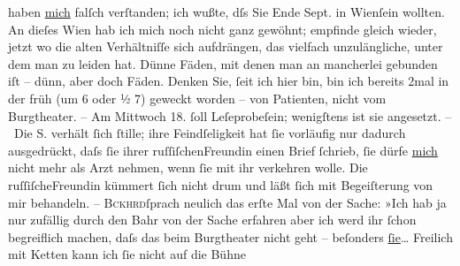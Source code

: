 \begin{ledgroupsized}[t]{13cm}
               haben \uline{mich} falſch verſtanden; ich wußte, dſs Sie Ende
               Sept. in Wienſein wollten. An dieſes Wien hab ich mich noch nicht ganz gewöhnt; empfinde gleich wieder, jetzt wo
               die alten Verhältniſſe sich aufdrängen, das vielfach unzulängliche, unter dem man zu
               leiden hat. Dünne Fäden, mit denen {\pb}man an mancherlei
               gebunden iſt – dünn, aber doch Fäden. Denken Sie, ſeit ich hier bin, bin ich bereits
               2mal in der früh \introOben{}(um 6 oder ½ 7)\introOben{} geweckt worden – von
               Patienten, nicht vom Burgtheater. – Am Mittwoch 18.
               ſoll Leſeprobeſein; wenigſtens ist sie angesetzt.\pend
           \pstart
           – Die S. verhält ſich ſtille; ihre Feindſeligkeit
               hat ſie vorläufig nur dadurch ausgedrückt, daſs ſie ihrer ruſſiſchenFreundin einen Brief ſchrieb,
               ſie dürfe \uline{mich} nicht mehr als Arzt nehmen, wenn ſie
               mit ihr verkehren wolle. Die ruſſiſcheFreundin kümmert ſich nicht
               drum {\pb}und läßt ſich mit Begeiſterung von mir
               behandeln. – \textsc{Bckhrd}ſprach neulich das erſte Mal von der Sache: »Ich
               hab ja nur zufällig durch den Bahr von der Sache
               erfahren {\dotstwo} aber ich werd ihr ſchon begreiflich machen,
               daſs das beim Burgtheater nicht geht – beſonders \uline{ſie}{\dots} Freilich mit Ketten kann ich ſie nicht auf die Bühne

\end{ledgroupsized}
